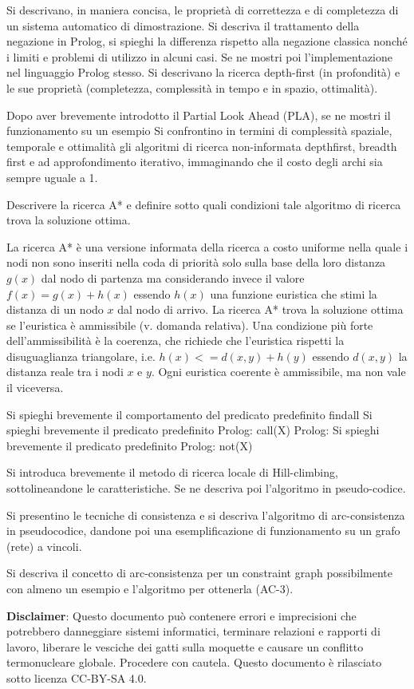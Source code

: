 \documentclass[answers, a4paper, 11pt]{exam}
\begin{document}
\begin{questions}
\question Si descrivano, in maniera concisa, le proprietà di correttezza e di completezza di un sistema automatico di
dimostrazione.
\question Si descriva il trattamento della negazione in Prolog, si spieghi la differenza rispetto alla negazione classica
nonché i limiti e problemi di utilizzo in alcuni casi. Se ne mostri poi l’implementazione nel linguaggio Prolog
stesso.
\question Si descrivano la ricerca depth-first (in profondità) e le sue proprietà (completezza, complessità in tempo e in spazio, ottimalità).

\question Dopo aver brevemente introdotto il Partial Look Ahead (PLA), se ne mostri il funzionamento su un esempio
\question Si confrontino in termini di complessità spaziale, temporale e ottimalità gli algoritmi di ricerca non-informata depthfirst, breadth first e ad approfondimento iterativo, immaginando che il costo degli archi sia sempre uguale a 1.


\question Descrivere la ricerca A* e definire sotto quali condizioni tale algoritmo di ricerca trova la soluzione ottima.
\begin{solution}
  La ricerca A* è una versione informata della ricerca a costo uniforme nella quale i nodi non sono inseriti nella coda di priorità solo sulla base della loro distanza $g(x)$ dal nodo di partenza ma considerando invece il valore $f(x) = g(x) + h(x)$ essendo $h(x)$ una funzione euristica che stimi la distanza di un nodo $x$ dal nodo di arrivo. 
  La ricerca A* trova la soluzione ottima se l'euristica è ammissibile (v. domanda relativa). 
  Una condizione più forte dell'ammissibilità è la coerenza, che richiede che l'euristica rispetti la disuguaglianza triangolare, i.e. $h(x) <= d(x, y) + h(y)$ essendo $d(x, y)$ la distanza reale tra i nodi $x$ e $y$. 
  Ogni euristica coerente è ammissibile, ma non vale il viceversa. 
\end{solution}

\question 
Si spieghi brevemente il comportamento del predicato predefinito findall
\question 
Si spieghi brevemente il predicato predefinito Prolog: call(X) 
Prolog:
\question Si spieghi brevemente il predicato predefinito Prolog: not(X) 

\question Si introduca brevemente il metodo di ricerca locale di Hill-climbing, sottolineandone le caratteristiche. Se ne descriva
poi l’algoritmo in pseudo-codice.

\question Si presentino le tecniche di consistenza e si descriva l'algoritmo di arc-consistenza in pseudocodice,
dandone poi una esemplificazione di funzionamento su un grafo (rete) a vincoli.

\question Si descriva il concetto di arc-consistenza per un constraint graph possibilmente con almeno un esempio e
l’algoritmo per ottenerla (AC-3).

\end{questions}


\textbf{Disclaimer}:  Questo documento può contenere errori e imprecisioni che potrebbero danneggiare sistemi informatici, terminare relazioni e rapporti di lavoro, liberare le vesciche dei gatti sulla moquette e causare un conflitto termonucleare globale.
Procedere con cautela.
Questo documento è rilasciato sotto licenza CC-BY-SA 4.0. \ccbysa
\end{document}
